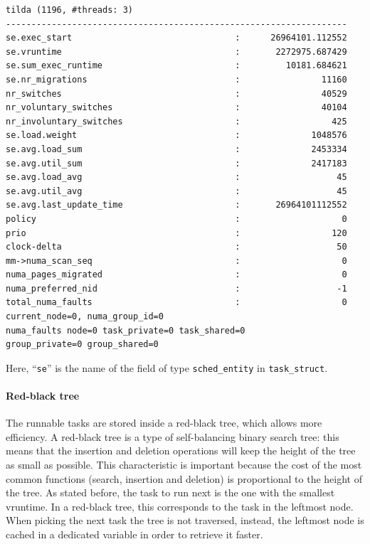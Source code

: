 \begin{verbatim}
tilda (1196, #threads: 3)
-------------------------------------------------------------------
se.exec_start                                :      26964101.112552
se.vruntime                                  :       2272975.687429
se.sum_exec_runtime                          :         10181.684621
se.nr_migrations                             :                11160
nr_switches                                  :                40529
nr_voluntary_switches                        :                40104
nr_involuntary_switches                      :                  425
se.load.weight                               :              1048576
se.avg.load_sum                              :              2453334
se.avg.util_sum                              :              2417183
se.avg.load_avg                              :                   45
se.avg.util_avg                              :                   45
se.avg.last_update_time                      :       26964101112552
policy                                       :                    0
prio                                         :                  120
clock-delta                                  :                   50
mm->numa_scan_seq                            :                    0
numa_pages_migrated                          :                    0
numa_preferred_nid                           :                   -1
total_numa_faults                            :                    0
current_node=0, numa_group_id=0
numa_faults node=0 task_private=0 task_shared=0 
group_private=0 group_shared=0
\end{verbatim}
Here, ``\verb|se|'' is the name of the field of type \verb|sched_entity| in \verb|task_struct|.

\paragraph{Red-black tree}
\label{sec:rb-tree}
The runnable tasks are stored inside a red-black tree, which allows more efficiency. A red-black tree is a type of self-balancing binary search tree: this means that the insertion and deletion operations will keep the height of the tree as small as possible. This characteristic is important because the cost of the most common functions (search, insertion and deletion) is proportional to the height of the tree.
As stated before, the task to run next is the one with the smallest vruntime. In a red-black tree, this corresponds to the task in the leftmost node. When picking the next task the tree is not traversed, instead, the leftmost node is cached in a dedicated variable in order to retrieve it faster.


